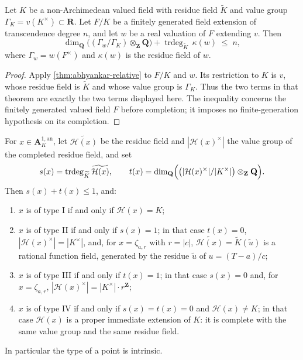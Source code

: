 \begin{lemma}
\label{lem:berk-abhyankar-valued}
Let $K$ be a non-Archimedean valued field with residue field
$\widetilde K$ and value group $\Gamma_K=v(K^\times)\subset\mathbf R$.
Let $F/K$ be a finitely generated field extension of transcendence
degree $n$, and let $w$ be a real valuation of $F$ extending
$v$.  Then
\[
 \dim_{\mathbf Q}
 \bigl((\Gamma_w/\Gamma_K)\otimes_{\mathbf Z}\mathbf Q\bigr)
 +\operatorname{trdeg}_{\widetilde K}\,\kappa(w)
 \;\leq\;n,
\]
where $\Gamma_w=w(F^\times)$ and $\kappa(w)$ is the residue field of
$w$.
\end{lemma}

\begin{proof}
Apply \cref{thm:abhyankar-relative} to $F/K$ and $w$. Its restriction
to $K$ is $v$, whose residue field is $\widetilde K$ and whose value
group is $\Gamma_K$. Thus the two terms in that theorem are exactly
the two terms displayed here. The inequality concerns the finitely
generated valued field $F$ before completion; it imposes no finite-generation
hypothesis on its completion.
\end{proof}

\begin{proposition}
\label{prop:berk-type-invariants}
For $x\in\mathbf A^{1,\mathrm{an}}_K$, let
$\widetilde{\mathcal H(x)}$ be the residue field and
$|\mathcal H(x)^\times|$ the value group of the completed residue
field, and set
\[
 s(x)=\operatorname{trdeg}_{\widetilde K}\widetilde{\mathcal H(x)},
 \qquad
 t(x)=\dim_{\mathbf Q}
 \Bigl(\bigl(|\mathcal H(x)^\times|/|K^\times|\bigr)
 \otimes_{\mathbf Z}\mathbf Q\Bigr).
\]
Then $s(x)+t(x)\leq1$, and:
\begin{enumerate}
\item $x$ is of type I if and only if $\mathcal H(x)=K$;
\item $x$ is of type II if and only if $s(x)=1$; in that case
      $t(x)=0$, $|\mathcal H(x)^\times|=|K^\times|$, and, for
      $x=\zeta_{a,r}$ with $r=|c|$,
      $\widetilde{\mathcal H(x)}=\widetilde K(\tilde u)$ is a rational
      function field, generated by the residue $\tilde u$ of
      $u=(T-a)/c$;
\item $x$ is of type III if and only if $t(x)=1$; in that case
      $s(x)=0$ and, for $x=\zeta_{a,r}$,
      $|\mathcal H(x)^\times|=|K^\times|\cdot r^{\mathbf Z}$;
\item $x$ is of type IV if and only if $s(x)=t(x)=0$ and
      $\mathcal H(x)\neq K$; in that case $\mathcal H(x)$ is a
      proper immediate extension of $K$: it is complete with the same
      value group and the same residue field.
\end{enumerate}
In particular the type of a point is intrinsic.
\end{proposition}

